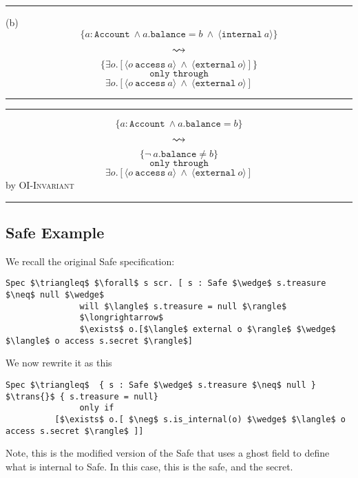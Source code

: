 \documentclass[12pt]{article}
\newcommand\trans[1]{\overset{#1}{\mathlarger{\mathlarger \leadsto}}}
\begin{document}
\hrule
\vspace{3mm}
(b)
$$
	\{a : \texttt{Account}\ \wedge a.\texttt{balance} = b\ \wedge\  \langle \texttt{internal}\ a \rangle\}
$$
$$\trans{}$$
$$
	\{\exists o.[\langle o\ \texttt{access}\ a\rangle\ \wedge\ \langle \texttt{external}\ o \rangle]\}
$$
$$\texttt{only through}$$
$$
	{\exists o.[\langle o\ \texttt{access}\ a\rangle\ \wedge\ \langle \texttt{external}\ o \rangle]}
$$
\vspace{3mm}
\hrule
\vspace{3mm}
\vspace{3mm}
\hrule
\vspace{3mm}
$$
	\{a : \texttt{Account}\ \wedge a.\texttt{balance} = b\}
$$
$$\trans{}$$
$$
	\{\neg\ a.\texttt{balance} \neq b\}
$$
$$\texttt{only through}$$
$$
	{\exists o.[\langle o\ \texttt{access}\ a\rangle\ \wedge\ \langle \texttt{external}\ o \rangle]}
$$
\hfill by \textsc{OI-Invariant}
\hrule
\vspace{3mm}

\newpage

\subsection{Safe Example}

We recall the original Safe specification:
\begin{lstlisting}[mathescape=true]
Spec $\triangleq$ $\forall$ s scr. [ s : Safe $\wedge$ s.treasure $\neq$ null $\wedge$
               will $\langle$ s.treasure = null $\rangle$
               $\longrightarrow$
               $\exists$ o.[$\langle$ external o $\rangle$ $\wedge$ $\langle$ o access s.secret $\rangle$]
\end{lstlisting}
We now rewrite it as this
\begin{lstlisting}[mathescape=true]
Spec $\triangleq$  { s : Safe $\wedge$ s.treasure $\neq$ null } $\trans{}$ { s.treasure = null}
               only if
          [$\exists$ o.[ $\neg$ s.is_internal(o) $\wedge$ $\langle$ o access s.secret $\rangle$ ]]
\end{lstlisting}
Note, this is the modified version of the Safe that uses a ghost field to define what is internal to Safe. 
In this case, this is the safe, and the secret.
\end{document}
